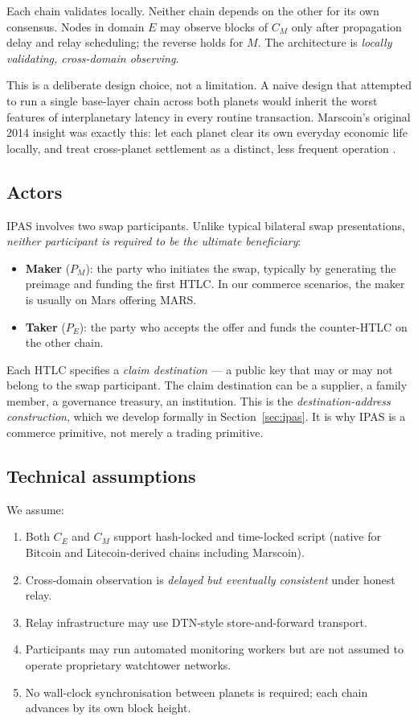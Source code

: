 \documentclass[11pt]{article}
\begin{document}
Each chain validates locally. Neither chain depends on the other for its own consensus. Nodes in domain $E$ may observe blocks of $C_M$ only after propagation delay and relay scheduling; the reverse holds for $M$. The architecture is \emph{locally validating, cross-domain observing}.

This is a deliberate design choice, not a limitation. A naive design that attempted to run a single base-layer chain across both planets would inherit the worst features of interplanetary latency in every routine transaction. Marscoin's original 2014 insight was exactly this: let each planet clear its own everyday economic life locally, and treat cross-planet settlement as a distinct, less frequent operation \citep{lopin2014marscoin}.

\subsection{Actors}

IPAS involves two swap participants. Unlike typical bilateral swap presentations, \emph{neither participant is required to be the ultimate beneficiary}:
\begin{itemize}
  \item \textbf{Maker} ($P_M$): the party who initiates the swap, typically by generating the preimage and funding the first HTLC. In our commerce scenarios, the maker is usually on Mars offering MARS.
  \item \textbf{Taker} ($P_E$): the party who accepts the offer and funds the counter-HTLC on the other chain.
\end{itemize}

Each HTLC specifies a \emph{claim destination} --- a public key that may or may not belong to the swap participant. The claim destination can be a supplier, a family member, a governance treasury, an institution. This is the \emph{destination-address construction}, which we develop formally in Section~\ref{sec:ipas}. It is why IPAS is a commerce primitive, not merely a trading primitive.

\subsection{Technical assumptions}

We assume:
\begin{enumerate}
  \item Both $C_E$ and $C_M$ support hash-locked and time-locked script (native for Bitcoin and Litecoin-derived chains including Marscoin).
  \item Cross-domain observation is \emph{delayed but eventually consistent} under honest relay.
  \item Relay infrastructure may use DTN-style store-and-forward transport.
  \item Participants may run automated monitoring workers but are not assumed to operate proprietary watchtower networks.
  \item No wall-clock synchronisation between planets is required; each chain advances by its own block height.
\end{enumerate}
\end{document}
